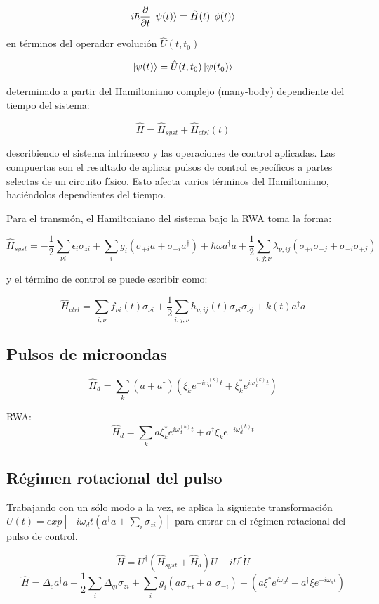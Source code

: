 \[
i \hbar \frac{\partial}{\partial t} \ket{\psi(t)} = \hat{H}(t) \ket{\phi(t)}
\]

en términos del operador evolución $\hat{U}(t,t_0)$

\[
\ket{\psi(t)} = \hat{U}(t,t_0) \ket{\psi(t_0)}
\]

determinado a partir del Hamiltoniano complejo (many-body) dependiente del tiempo del sistema:

\[
\hat{H} = \hat{H}_{syst} + \hat{H}_{ctrl}(t)
\]

describiendo el sistema intrínseco y las operaciones de control aplicadas. Las compuertas son el resultado de aplicar pulsos de control específicos a partes selectas de un circuito físico. Esto afecta varios términos del Hamiltoniano, haciéndolos dependientes del tiempo.

Para el transmón, el Hamiltoniano del sistema bajo la RWA toma la forma:

\[
\hat{H}_{syst} = -\frac{1}{2} \sum\limits_{\nu i} \epsilon_i \sigma_{z i} + \sum\limits_{i} g_i (\sigma_{+ i} a + \sigma_{- i} a^\dag) + \hbar \omega a^\dag a + \frac{1}{2} \sum\limits_{i,j;\nu} \lambda_{\nu, ij} (\sigma_{+ i} \sigma_{- j} + \sigma_{- i} \sigma_{+ j})
\]

y el término de control se puede escribir como:

\[
\hat{H}_{ctrl} = \sum\limits_{i; \nu} f_{\nu i}(t) \sigma_{\nu i} + \frac{1}{2} \sum\limits_{i,j;\nu} h_{\nu, ij}(t) \sigma_{\nu i} \sigma_{\nu j} + k(t) a^\dag a
\]

\subsection{Pulsos de microondas}

$$\hat{H}_d = \sum\limits_k (a+a^\dagger) (\xi_k e^{-i\omega_d^{(k)}t} + \xi_k^*e^{i\omega_d^{(k)}t})$$

RWA: $$\hat{H}_d=\sum\limits_k a\xi_k^*e^{i\omega_d^{(k)}t}+ a^\dagger\xi_ke^{-i\omega_d^{(k)}t}$$

\subsection{Régimen rotacional del pulso}

Trabajando con un sólo modo a la vez, se aplica la siguiente transformación $U(t) = exp[-i \omega_d t(a^\dagger a + \sum\limits_i \sigma_{z i})]$ para entrar en el régimen rotacional del pulso de control.

$$\hat{H} = U^\dagger (\hat{H}_{syst} + \hat{H}_d) U - i U^\dagger \dot{U}$$
$$ \hat{H} = \Delta_c a^\dagger a + \frac{1}{2} \sum\limits_i \Delta_{qi} \sigma_{zi} + \sum\limits_i g_i (a \sigma_{+ i} + a^\dagger \sigma_{- i}) + (a\xi^*e^{i\omega_d t}+a^\dagger\xi e^{-i\omega_d t})$$

